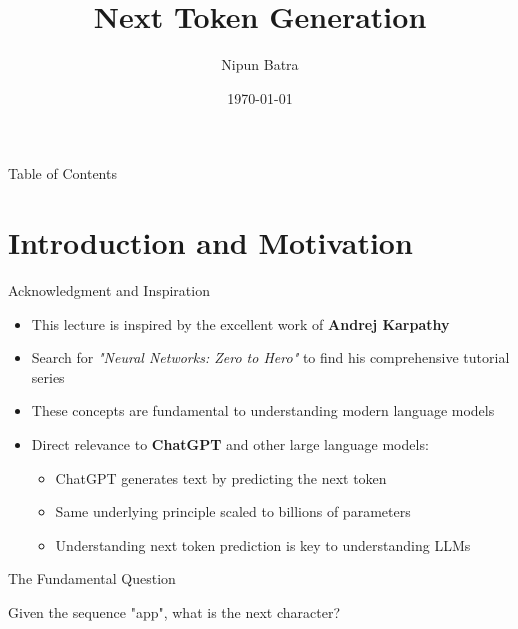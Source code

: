 \documentclass[usenames,dvipsnames]{beamer}
\title{Next Token Generation}
\date{\today}
\author{Nipun Batra}
\institute{IIT Gandhinagar}
\begin{document}
\maketitle

\begin{frame}{Table of Contents}
\tableofcontents
\end{frame}

\section{Introduction and Motivation}

\begin{frame}{Acknowledgment and Inspiration}
\begin{itemize}[<+->]
\item This lecture is inspired by the excellent work of \textbf{Andrej Karpathy}
\item Search for \textit{"Neural Networks: Zero to Hero"} to find his comprehensive tutorial series
\item These concepts are fundamental to understanding modern language models
\item Direct relevance to \textbf{ChatGPT} and other large language models:
\begin{itemize}
\item ChatGPT generates text by predicting the next token
\item Same underlying principle scaled to billions of parameters
\item Understanding next token prediction is key to understanding LLMs
\end{itemize}
\end{itemize}
\end{frame}

\begin{frame}{The Fundamental Question}
\begin{center}
\end{center}

\vspace{1cm}
\begin{center}
{\Large Given the sequence "app", what is the next character?}
\end{center}
\end{frame}
\end{document}
